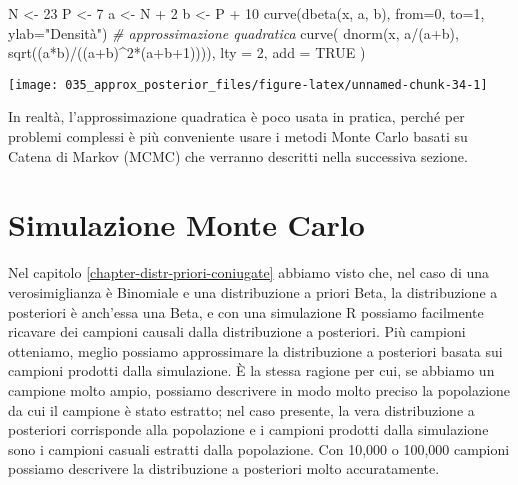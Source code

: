 \documentclass[
]{memoir}
\newenvironment{Shaded}{\begin{snugshade}}{\end{snugshade}}
\newcommand{\AttributeTok}[1]{\textcolor[rgb]{0.77,0.63,0.00}{#1}}
\newcommand{\CommentTok}[1]{\textcolor[rgb]{0.56,0.35,0.01}{\textit{#1}}}
\newcommand{\ConstantTok}[1]{\textcolor[rgb]{0.00,0.00,0.00}{#1}}
\newcommand{\DecValTok}[1]{\textcolor[rgb]{0.00,0.00,0.81}{#1}}
\newcommand{\FunctionTok}[1]{\textcolor[rgb]{0.00,0.00,0.00}{#1}}
\newcommand{\NormalTok}[1]{#1}
\newcommand{\OtherTok}[1]{\textcolor[rgb]{0.56,0.35,0.01}{#1}}
\newcommand{\SpecialCharTok}[1]{\textcolor[rgb]{0.00,0.00,0.00}{#1}}
\newcommand{\StringTok}[1]{\textcolor[rgb]{0.31,0.60,0.02}{#1}}
\begin{document}
\begin{Shaded}
\begin{Highlighting}[]
\NormalTok{N }\OtherTok{\textless{}{-}} \DecValTok{23}
\NormalTok{P }\OtherTok{\textless{}{-}} \DecValTok{7}
\NormalTok{a }\OtherTok{\textless{}{-}}\NormalTok{ N }\SpecialCharTok{+} \DecValTok{2}
\NormalTok{b }\OtherTok{\textless{}{-}}\NormalTok{ P }\SpecialCharTok{+} \DecValTok{10}
\FunctionTok{curve}\NormalTok{(}\FunctionTok{dbeta}\NormalTok{(x, a, b), }\AttributeTok{from=}\DecValTok{0}\NormalTok{, }\AttributeTok{to=}\DecValTok{1}\NormalTok{, }\AttributeTok{ylab=}\StringTok{"Densità"}\NormalTok{)}
\CommentTok{\# approssimazione quadratica}
\FunctionTok{curve}\NormalTok{(}
  \FunctionTok{dnorm}\NormalTok{(x, a}\SpecialCharTok{/}\NormalTok{(a}\SpecialCharTok{+}\NormalTok{b), }\FunctionTok{sqrt}\NormalTok{((a}\SpecialCharTok{*}\NormalTok{b)}\SpecialCharTok{/}\NormalTok{((a}\SpecialCharTok{+}\NormalTok{b)}\SpecialCharTok{\^{}}\DecValTok{2}\SpecialCharTok{*}\NormalTok{(a}\SpecialCharTok{+}\NormalTok{b}\SpecialCharTok{+}\DecValTok{1}\NormalTok{)))),}
  \AttributeTok{lty =} \DecValTok{2}\NormalTok{,}
  \AttributeTok{add =} \ConstantTok{TRUE}
\NormalTok{)}
\end{Highlighting}
\end{Shaded}

\begin{center}\texttt{[image: 035\_approx\_posterior\_files/figure-latex/unnamed-chunk-34-1]} \end{center}

In realtà, l'approssimazione quadratica è poco usata in pratica, perché per problemi complessi è più conveniente usare i metodi Monte Carlo basati su Catena di Markov (MCMC) che verranno descritti nella successiva sezione.

\hypertarget{chapter-simulazioneMC}{%
\section{Simulazione Monte Carlo}\label{chapter-simulazioneMC}}

Nel capitolo \ref{chapter-distr-priori-coniugate} abbiamo visto che, nel caso di una verosimiglianza è Binomiale e una distribuzione a priori Beta, la distribuzione a posteriori è anch'essa una Beta, e con una simulazione R possiamo facilmente ricavare dei campioni causali dalla distribuzione a posteriori. Più campioni otteniamo, meglio possiamo approssimare la distribuzione a posteriori basata sui campioni prodotti dalla simulazione. È la stessa ragione per cui, se abbiamo un campione molto ampio, possiamo descrivere in modo molto preciso la popolazione da cui il campione è stato estratto; nel caso presente, la vera distribuzione a posteriori corrisponde alla popolazione e i campioni prodotti dalla simulazione sono i campioni casuali estratti dalla popolazione. Con 10,000 o 100,000 campioni possiamo descrivere la distribuzione a posteriori molto accuratamente.
\end{document}
